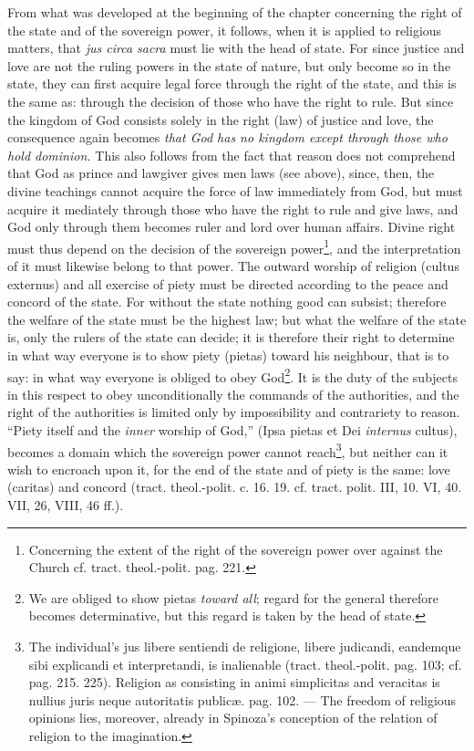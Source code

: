 \documentclass[12pt,a4paper,openany]{book}
\newcommand{\opage}[1]{\marginnote{\footnotesize\textit{[#1]}}}
\begin{document}
From what was developed at the beginning of the chapter concerning the right of the state and of the sovereign power, it follows, when it is applied to religious matters, that \emph{jus circa sacra} must lie with the head of state. For since justice and love are not the ruling powers in the state of nature, but only become so in the state, they can first acquire legal force through the right of the state, and this is the same as: through the decision of those who have the right to rule. But since the kingdom of God consists solely in the right (law) of justice and love, the consequence again becomes \emph{that God has no kingdom except through those who hold dominion.} This also follows from the fact that reason does not comprehend that God as prince and lawgiver gives men laws (see above), since, then, the divine teachings cannot acquire the force of law immediately from God, but must acquire it mediately through those who have the right to rule and give laws, and God only through them becomes ruler and lord over human affairs. Divine right must thus depend on the decision of the sovereign power\footnote{Concerning the extent of the right of the sovereign power over against the Church cf. tract. theol.-polit. pag. 221.}, and the
\opage{160}\setcounter{footnote}{0}interpretation of it must likewise belong to that power. The outward worship of religion (cultus externus) and all exercise of piety must be directed according to the peace and concord of the state. For without the state nothing good can subsist; therefore the welfare of the state must be the highest law; but what the welfare of the state is, only the rulers of the state can decide; it is therefore their right to determine in what way everyone is to show piety (pietas) toward his neighbour, that is to say: in what way everyone is obliged to obey God\footnote{We are obliged to show pietas \emph{toward all}; regard for the general therefore becomes determinative, but this regard is taken by the head of state.}. It is the duty of the subjects in this respect to obey unconditionally the commands of the authorities, and the right of the authorities is limited only by impossibility and contrariety to reason. ``Piety itself and the \emph{inner} worship of God,'' (Ipsa pietas et Dei \emph{internus} cultus), becomes a domain which the sovereign power cannot reach\footnote{The individual's jus libere sentiendi de religione, libere judicandi, eandemque sibi explicandi et interpretandi, is inalienable (tract. theol.-polit. pag. 103; cf. pag. 215. 225). Religion as consisting in animi simplicitas and veracitas is nullius juris neque autoritatis publicæ. pag. 102. --- The freedom of religious opinions lies, moreover, already in Spinoza's conception of the relation of religion to the imagination.}, but neither can it wish to encroach upon it, for the end of the state and of piety is the same: love (caritas) and concord (tract. theol.-polit. c. 16. 19. cf. tract. polit. III, 10. VI, 40. VII, 26, VIII, 46 ff.). %
\end{document}
